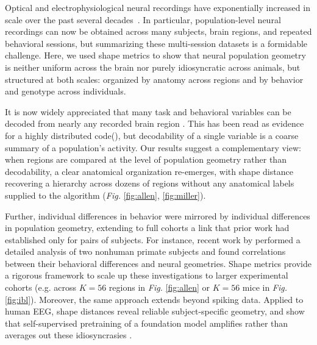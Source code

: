 Optical and electrophysiological neural recordings have exponentially increased in scale over the past several decades~\parencite{stevenson2011advances,urai2022large}.
In particular, population-level neural recordings can now be obtained across many subjects, brain regions, and repeated behavioral sessions, but summarizing these multi-session datasets is a formidable challenge.
Here, we used shape metrics to show that neural population geometry is neither uniform across the brain nor purely idiosyncratic across animals, but structured at both scales: organized by anatomy across regions and by behavior and genotype across individuals.

It is now widely appreciated that many task and behavioral variables can be decoded from nearly any recorded brain region \parencite{steinmetz2019distributed,stringer2019spontaneous,musall2019,angelaki2025brain, Lloreda2025,rosen2026distributed}.
This has been read as evidence for a highly distributed code(\textcite{hayden2026rethinking,fine2021whole,Lloreda2025}), but decodability of a single variable is a coarse summary of a population's activity.
Our results suggest a complementary view: when regions are compared at the level of population geometry rather than decodability, a clear anatomical organization re-emerges, with shape distance recovering a hierarchy across dozens of regions without any anatomical labels supplied to the algorithm (\textit{Fig.} \ref{fig:allen}, \ref{fig:miller}).

Further, individual differences in behavior were mirrored by individual differences in population geometry, extending to full cohorts a link that prior work had established only for pairs of subjects.
For instance, recent work by \textcite{fascianelli2024neural} performed a detailed analysis of two nonhuman primate subjects and found correlations between their behavioral differences and neural geometries.
Shape metrics provide a rigorous framework to scale up these investigations to larger experimental cohorts (e.g. across $K = 56$ regions in \textit{Fig.} \ref{fig:allen} or $K = 56$ mice in \textit{Fig.} \ref{fig:ibl}). Moreover, the same approach extends beyond spiking data. Applied to human EEG, shape distances reveal reliable subject-specific geometry, and show that self-supervised pretraining of a foundation model \parencite{cui2024,wang2025} amplifies rather than averages out these idiosyncrasies \parencite{marty2026}.

